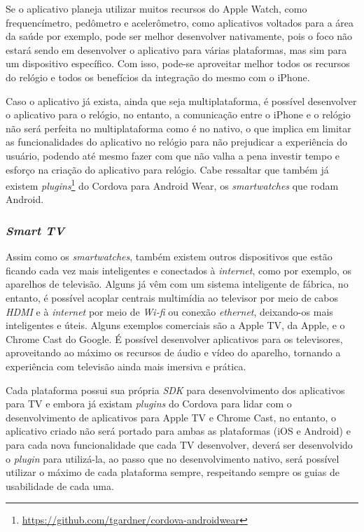 Se o aplicativo planeja utilizar muitos recursos do Apple Watch, como frequencímetro, pedômetro e acelerômetro, como aplicativos voltados para a área da saúde por exemplo, pode ser melhor desenvolver nativamente,
pois o foco não estará sendo em desenvolver o aplicativo para várias plataformas, mas sim para um dispositivo específico. Com isso, pode-se aproveitar melhor todos os recursos do relógio e todos os benefícios da integração
do mesmo com o iPhone.

Caso o aplicativo já exista, ainda que seja multiplataforma, é possível desenvolver o aplicativo para o relógio, no entanto, a comunicação entre o iPhone e o relógio não será perfeita no multiplataforma como é no nativo, 
o que implica em limitar as funcionalidades do aplicativo no relógio para não prejudicar a experiência do usuário, podendo até mesmo fazer com que não valha a pena investir tempo e esforço na criação do aplicativo para
relógio. Cabe ressaltar que também já existem \textit{plugins}\footnote{\url{https://github.com/tgardner/cordova-androidwear}} do Cordova para Android Wear, os \textit{smartwatches} que rodam Android.

\subsubsection{\textit{Smart TV}} \label{subsubsec:tv}
Assim como os \textit{smartwatches}, também existem outros dispositivos que estão ficando cada vez mais inteligentes e conectados à \textit{internet}, como por exemplo, os aparelhos de televisão. Alguns já vêm
com um sistema inteligente de fábrica, no entanto, é possível acoplar centrais multimídia ao televisor por meio de cabos \textit{HDMI} e à \textit{internet} por meio de \textit{Wi-fi} ou conexão \textit{ethernet}, 
deixando-os mais inteligentes e úteis. Alguns exemplos comerciais são a Apple TV, da Apple, e o Chrome Cast do Google. É possível desenvolver aplicativos para os televisores, aproveitando ao máximo os recursos de 
áudio e vídeo do aparelho, tornando a experiência com televisão ainda mais imersiva e prática. 

Cada plataforma possui sua própria \textit{SDK} para desenvolvimento dos aplicativos para TV e embora já existam \textit{plugins} do Cordova para lidar com o desenvolvimento de aplicativos para Apple TV e Chrome Cast, 
no entanto, o aplicativo criado não será portado para ambas as plataformas (iOS e Android) e para cada nova funcionalidade que cada TV desenvolver, deverá ser desenvolvido o \textit{plugin} para utilizá-la, ao passo que 
no desenvolvimento nativo, será possível utilizar o máximo de cada plataforma sempre, respeitando sempre os guias de usabilidade de cada uma. 

